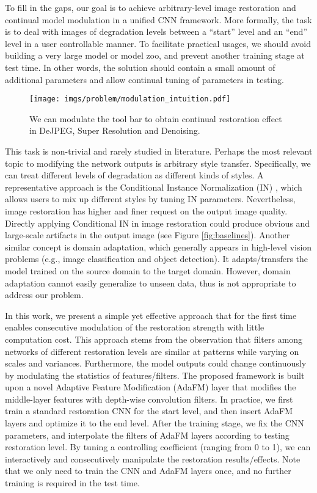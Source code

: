 \documentclass[10pt,twocolumn,letterpaper]{article}
\begin{document}
To fill in the gaps, our goal is to achieve arbitrary-level image restoration and continual model modulation in a unified CNN framework. More formally, the task is to deal with images of degradation levels between a ``start'' level and an ``end'' level in a user controllable manner. To facilitate practical usages, we should avoid building a very large model or model zoo, and prevent another training stage at test time. In other words, the solution should contain a small amount of additional parameters and allow continual tuning of parameters in testing. 

\begin{figure}[]
	\centering
	\texttt{[image: imgs/problem/modulation\_intuition.pdf]}
	\vspace{-0.5em}
	\caption{We can modulate the tool bar to obtain continual restoration effect in DeJPEG, Super Resolution and Denoising.}
	\vspace{-2em}
	\label{fig:solution}
\end{figure}


This task is non-trivial and rarely studied in literature. Perhaps the most relevant topic to modifying the network outputs is arbitrary style transfer. Specifically, we can treat different levels of degradation as different kinds of styles. A representative approach is the Conditional Instance Normalization (IN) \cite{dumoulin2017learned}, which allows users to mix up different styles by tuning IN parameters. Nevertheless, image restoration has higher and finer request on the output image quality. Directly applying Conditional IN in image restoration could produce obvious and large-scale artifacts in the output image (see Figure \ref{fig:baselines}). Another similar concept is domain adaptation, which generally appears in high-level vision problems (e.g., image classification and object detection). It adapts/transfers the model trained on the source domain to the target domain. However, domain adaptation cannot easily generalize to unseen data, thus is not appropriate to address our problem.


In this work, we present a simple yet effective approach that for the first time enables consecutive modulation of the restoration strength with little computation cost. This approach stems from the observation that filters among networks of different restoration levels are similar at patterns while varying on scales and variances. Furthermore, the model outputs could change continuously by modulating the statistics of features/filters. The proposed framework is built upon a novel Adaptive Feature Modification (AdaFM) layer that modifies the middle-layer features with depth-wise convolution filters. In practice, we first train a standard restoration CNN for the start level, and then insert AdaFM layers and optimize it to the end level. After the training stage, we fix the CNN parameters, and interpolate the filters of AdaFM layers according to testing restoration level. By tuning a controlling coefficient (ranging from 0 to 1), we can interactively and consecutively manipulate the restoration results/effects. Note that we only need to train the CNN and AdaFM layers once, and no further training is required in the test time. 
\end{document}

